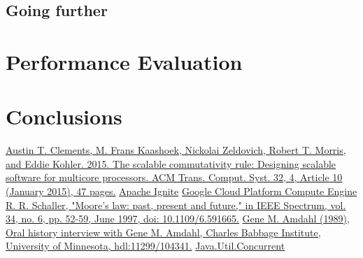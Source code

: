 \documentclass[conference]{IEEEtran}
\begin{document}
\subsection{Going further}
\bigbreak



\bigbreak
\section{Performance Evaluation}
\bigbreak
\section{Conclusions}
\bigbreak



\begin{thebibliography}{00}
 \href{https://dl.acm.org/doi/10.1145/2699681}{Austin T. Clements, M. Frans Kaashoek, Nickolai Zeldovich, Robert T. Morris, and Eddie Kohler. 2015. The scalable commutativity rule: Designing scalable software for multicore processors. ACM Trans. Comput. Syst. 32, 4, Article 10 (January 2015), 47 pages.}
 \href{https://ignite.apache.org/docs/latest/}{Apache Ignite}
 \href{https://cloud.google.com/compute/docs}{Google Cloud Platform Compute Engine}
 \href{https://ieeexplore.ieee.org/document/591665}{R. R. Schaller, "Moore's law: past, present and future," in IEEE Spectrum, vol. 34, no. 6, pp. 52-59, June 1997, doi: 10.1109/6.591665.}
 \href{https://conservancy.umn.edu/handle/11299/104341}{Gene M. Amdahl (1989), Oral history interview with Gene M. Amdahl, Charles Babbage Institute, University of Minnesota, hdl:11299/104341.}
 \href{https://docs.oracle.com/javase/8/docs/api/index.html?java/util/concurrent/package-summary.html}{Java.Util.Concurrent}

\end{thebibliography}

\vspace{12pt}
\end{document}
